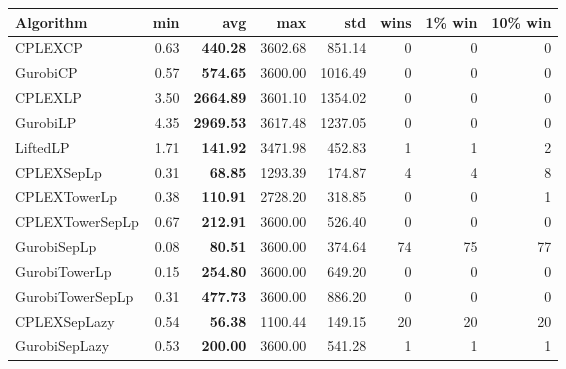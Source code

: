 \begin{tabular}{lrrrrrrr}
Algorithm & min & avg & max & std
& wins & 1\% win & 10\% win 
\\
\hline
CPLEXCP&0.63& \bf440.28& 3602.68& 851.14&0&0&0\\
GurobiCP&0.57& \bf574.65& 3600.00& 1016.49&0&0&0\\
CPLEXLP&3.50& \bf2664.89& 3601.10& 1354.02&0&0&0\\
GurobiLP&4.35& \bf2969.53& 3617.48& 1237.05&0&0&0\\
LiftedLP&1.71& \bf141.92& 3471.98& 452.83&1&1&2\\
CPLEXSepLp&0.31& \bf68.85& 1293.39& 174.87&4&4&8\\
CPLEXTowerLp&0.38& \bf110.91& 2728.20& 318.85&0&0&1\\
CPLEXTowerSepLp&0.67& \bf212.91& 3600.00& 526.40&0&0&0\\
GurobiSepLp&0.08& \bf80.51& 3600.00& 374.64&74&75&77\\
GurobiTowerLp&0.15& \bf254.80& 3600.00& 649.20&0&0&0\\
GurobiTowerSepLp&0.31& \bf477.73& 3600.00& 886.20&0&0&0\\
CPLEXSepLazy&0.54& \bf56.38& 1100.44& 149.15&20&20&20\\
GurobiSepLazy&0.53& \bf200.00& 3600.00& 541.28&1&1&1
\end{tabular}
